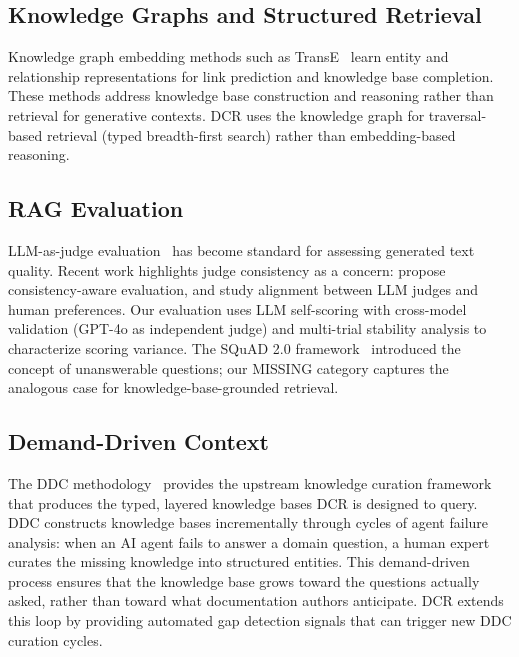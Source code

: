 \documentclass[11pt,a4paper]{article}
\begin{document}
\subsection{Knowledge Graphs and Structured Retrieval}

Knowledge graph embedding methods such as TransE~\citep{bordes2013transe} learn entity and relationship representations for link prediction and knowledge base completion. These methods address knowledge base construction and reasoning rather than retrieval for generative contexts. DCR uses the knowledge graph for traversal-based retrieval (typed breadth-first search) rather than embedding-based reasoning.

\subsection{RAG Evaluation}

LLM-as-judge evaluation~\citep{zheng2023judging} has become standard for assessing generated text quality. Recent work highlights judge consistency as a concern: \citet{liu2025consjudge} propose consistency-aware evaluation, and \citet{shankar2024validates} study alignment between LLM judges and human preferences. Our evaluation uses LLM self-scoring with cross-model validation (GPT-4o as independent judge) and multi-trial stability analysis to characterize scoring variance. The SQuAD 2.0 framework~\citep{rajpurkar2018squad} introduced the concept of unanswerable questions; our MISSING category captures the analogous case for knowledge-base-grounded retrieval.

\subsection{Demand-Driven Context}

The DDC methodology~\citep{navakoti2026ddc} provides the upstream knowledge curation framework that produces the typed, layered knowledge bases DCR is designed to query. DDC constructs knowledge bases incrementally through cycles of agent failure analysis: when an AI agent fails to answer a domain question, a human expert curates the missing knowledge into structured entities. This demand-driven process ensures that the knowledge base grows toward the questions actually asked, rather than toward what documentation authors anticipate. DCR extends this loop by providing automated gap detection signals that can trigger new DDC curation cycles.

\end{document}
